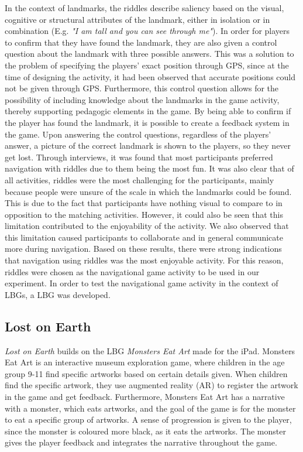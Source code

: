 In the context of landmarks, the riddles describe saliency based on the visual, cognitive or structural attributes of the landmark, either in isolation or in combination (E.g. \textit{"I am tall and you can see through me"}). In order for players to confirm that they have found the landmark, they are also given a control question about the landmark with three possible answers. This was a solution to the problem of specifying the players' exact position through GPS, since at the time of designing the activity, it had been observed that accurate positions could not be given through GPS. Furthermore, this control question allows for the possibility of including knowledge about the landmarks in the game activity, thereby supporting pedagogic elements in the game. By being able to confirm if the player has found the landmark, it is possible to create a feedback system in the game. Upon answering the control questions, regardless of the players' answer, a picture of the correct landmark is shown to the players, so they never get lost. Through interviews, it was found that most participants preferred navigation with riddles due to them being the most fun. It was also clear that of all activities, riddles were the most challenging for the participants, mainly because people were unsure of the scale in which the landmarks could be found. This is due to the fact that participants have nothing visual to compare to in opposition to the matching activities. However, it could also be seen that this limitation contributed to the enjoyability of the activity. We also observed that this limitation caused participants to collaborate and in general communicate more during navigation. Based on these results, there were strong indications that navigation using riddles was the most enjoyable activity. For this reason, riddles were chosen as the navigational game activity to be used in our experiment. In order to test the navigational game activity in the context of LBGs, a LBG was developed.

\subsection{Lost on Earth}
\textit{Lost on Earth} builds on the LBG \textit{Monsters Eat Art}\cite{Lynge} made for the iPad. Monsters Eat Art is an interactive museum exploration game, where children in the age group 9-11 find specific artworks based on certain details given. When children find the specific artwork, they use augmented reality (AR) to register the artwork in the game and get feedback. Furthermore, Monsters Eat Art has a narrative with a monster, which eats artworks, and the goal of the game is for the monster to eat a specific group of artworks. A sense of progression is given to the player, since the monster is coloured more black, as it eats the artworks. The monster gives the player feedback and integrates the narrative throughout the game.

